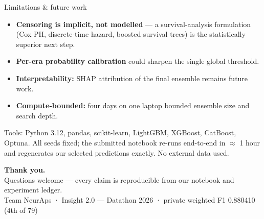 \documentclass[aspectratio=169,10pt]{beamer}
\begin{document}
\begin{frame}{Limitations \& future work}
  \begin{itemize}
    \item \textbf{Censoring is implicit, not modelled} --- a survival-analysis formulation
          (Cox PH, discrete-time hazard, boosted survival trees) is the statistically
          superior next step.
    \item \textbf{Per-era probability calibration} could sharpen the single global threshold.
    \item \textbf{Interpretability:} SHAP attribution of the final ensemble remains future work.
    \item \textbf{Compute-bounded:} four days on one laptop bounded ensemble size and search depth.
  \end{itemize}
  \vspace{6pt}\scriptsize\color{mutedgray}
  Tools: Python 3.12, pandas, scikit-learn, LightGBM, XGBoost, CatBoost, Optuna.
  All seeds fixed; the submitted notebook re-runs end-to-end in $\approx$ 1 hour and
  regenerates our selected predictions exactly. No external data used.
\end{frame}

\begin{frame}[plain]
  \vspace{2.6cm}
  {\color{white}\Huge\bfseries Thank you.}\\[10pt]
  {\color{ruleline}\large Questions welcome --- every claim is reproducible from our
   notebook and experiment ledger.}\\[22pt]
  {\color{ruleline}\ttfamily\small Team NeurAps \;·\; Insight 2.0 --- Datathon 2026 \;·\;
   private weighted F1 0.880410 (4th of 79)}
\end{frame}
\end{document}
